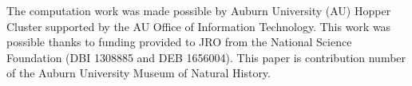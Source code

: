 The computation work was made possible by Auburn University (AU) Hopper Cluster
supported by the AU Office of Information Technology.
This work was possible thanks to funding provided to JRO from the National
Science Foundation (DBI 1308885 and DEB 1656004).
This paper is contribution number  of the Auburn University
Museum of Natural History.

